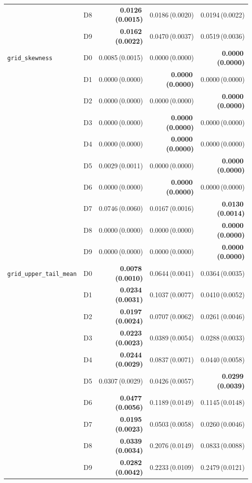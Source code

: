 \begin{longtable}{@{}llrrr@{}}
 & D8 & \textbf{0.0126\,(0.0015)} & 0.0186\,(0.0020) & 0.0194\,(0.0022) \\
 & D9 & \textbf{0.0162\,(0.0022)} & 0.0470\,(0.0037) & 0.0519\,(0.0036) \\
\midrule
\texttt{grid\_skewness} & D0 & 0.0085\,(0.0015) & 0.0000\,(0.0000) & \textbf{0.0000\,(0.0000)} \\
 & D1 & 0.0000\,(0.0000) & \textbf{0.0000\,(0.0000)} & 0.0000\,(0.0000) \\
 & D2 & 0.0000\,(0.0000) & 0.0000\,(0.0000) & \textbf{0.0000\,(0.0000)} \\
 & D3 & 0.0000\,(0.0000) & \textbf{0.0000\,(0.0000)} & 0.0000\,(0.0000) \\
 & D4 & 0.0000\,(0.0000) & \textbf{0.0000\,(0.0000)} & 0.0000\,(0.0000) \\
 & D5 & 0.0029\,(0.0011) & 0.0000\,(0.0000) & \textbf{0.0000\,(0.0000)} \\
 & D6 & 0.0000\,(0.0000) & \textbf{0.0000\,(0.0000)} & 0.0000\,(0.0000) \\
 & D7 & 0.0746\,(0.0060) & 0.0167\,(0.0016) & \textbf{0.0130\,(0.0014)} \\
 & D8 & 0.0000\,(0.0000) & 0.0000\,(0.0000) & \textbf{0.0000\,(0.0000)} \\
 & D9 & 0.0000\,(0.0000) & 0.0000\,(0.0000) & \textbf{0.0000\,(0.0000)} \\
\midrule
\texttt{grid\_upper\_tail\_mean} & D0 & \textbf{0.0078\,(0.0010)} & 0.0644\,(0.0041) & 0.0364\,(0.0035) \\
 & D1 & \textbf{0.0234\,(0.0031)} & 0.1037\,(0.0077) & 0.0410\,(0.0052) \\
 & D2 & \textbf{0.0197\,(0.0024)} & 0.0707\,(0.0062) & 0.0261\,(0.0046) \\
 & D3 & \textbf{0.0223\,(0.0023)} & 0.0389\,(0.0054) & 0.0288\,(0.0033) \\
 & D4 & \textbf{0.0244\,(0.0029)} & 0.0837\,(0.0071) & 0.0440\,(0.0058) \\
 & D5 & 0.0307\,(0.0029) & 0.0426\,(0.0057) & \textbf{0.0299\,(0.0039)} \\
 & D6 & \textbf{0.0477\,(0.0056)} & 0.1189\,(0.0149) & 0.1145\,(0.0148) \\
 & D7 & \textbf{0.0195\,(0.0023)} & 0.0503\,(0.0058) & 0.0260\,(0.0046) \\
 & D8 & \textbf{0.0339\,(0.0034)} & 0.2076\,(0.0149) & 0.0833\,(0.0088) \\
 & D9 & \textbf{0.0282\,(0.0042)} & 0.2233\,(0.0109) & 0.2479\,(0.0121) \\
\end{longtable}
\endgroup


